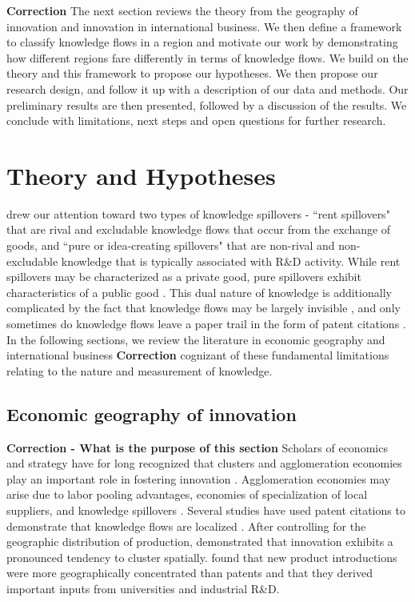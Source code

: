 \documentclass[12pt,letterpaper]{article}
\begin{document}
\textbf{Correction}
The next section reviews the theory from the geography of innovation and innovation in international business. We then define a framework to classify knowledge flows in a region and motivate our work by demonstrating how different regions fare differently in terms of knowledge flows. We build on the theory and this framework to propose our hypotheses. We then propose our research design, and follow it up with a description of our data and methods. Our preliminary results are then presented, followed by a discussion of the results. We conclude with limitations, next steps and open questions for further research.



\section*{Theory and Hypotheses}
\cite{Griliches1979} drew our attention toward two types of knowledge spillovers - ``rent spillovers" that  are rival and excludable knowledge flows that occur from the exchange of goods, and ``pure or idea-creating spillovers"  that are non-rival and non-excludable knowledge that is typically associated with R\&D activity. While rent spillovers may be characterized as a private good, pure spillovers exhibit characteristics of a public good \citep{Arrow1962}.  This dual nature of knowledge is additionally complicated by the fact that knowledge flows may be largely invisible \citep{Krugman1991a}, and only sometimes do knowledge flows leave a paper trail in the form of patent citations \citep{Jaffe1993}. In the following sections, we review the literature in economic geography and international business \textbf{Correction} cognizant of these fundamental limitations relating to the nature and measurement of knowledge.


\subsection{Economic geography of innovation}
\textbf{Correction - What is the purpose of this section}
Scholars of economics and strategy have for long recognized that clusters and agglomeration economies play an important role in fostering innovation \citep{Marshall1890, Porter1990}. Agglomeration economies may arise due to labor pooling advantages, economies of specialization of local suppliers, and knowledge spillovers \citep{Porter1990, Krugman1991a}.  Several studies have used patent citations to demonstrate that knowledge flows are localized \citep*{Jaffe1993, Almeida1999}. After controlling for the geographic distribution of production, \cite{Audretsch1996a} demonstrated that innovation exhibits a pronounced tendency to cluster spatially. \cite*{Acs1994} found that new product introductions were more geographically concentrated than patents and that they derived important inputs from universities and industrial R\&D. \par
\end{document}
